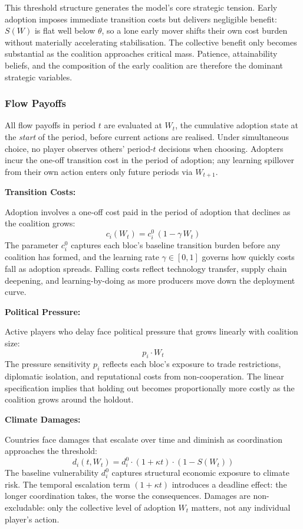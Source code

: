 \documentclass[10pt,a4paper]{article}
\newcommand{\bpar}[1]{%
  \par\addvspace{\medskipamount}%
  \needspace{4\baselineskip}%
  \noindent\textbf{#1}\par\nopagebreak[4]%
}
\begin{document}
This threshold structure generates the model's core strategic tension. Early adoption imposes immediate transition costs but delivers negligible benefit: $S(W)$ is flat well below $\theta$, so a lone early mover shifts their own cost burden without materially accelerating stabilisation. The collective benefit only becomes substantial as the coalition approaches critical mass. Patience, attainability beliefs, and the composition of the early coalition are therefore the dominant strategic variables.

\needspace{12em}
\subsubsection*{Flow Payoffs}

All flow payoffs in period $t$ are evaluated at $W_t$, the cumulative adoption state at the
\textit{start} of the period, before current actions are realised. Under simultaneous choice,
no player observes others' period-$t$ decisions when choosing. Adopters incur the one-off
transition cost in the period of adoption; any learning spillover from their own action enters
only future periods via $W_{t+1}$.

\bpar{Transition Costs:}
Adoption involves a one-off cost paid in the period of adoption that declines as the coalition
grows:
\[
c_i(W_t) = c_i^0\,(1 - \gamma\, W_t)
\]
The parameter $c_i^0$ captures each bloc's baseline transition burden before any coalition has
formed, and the learning rate $\gamma \in [0,1]$ governs how quickly costs fall as adoption
spreads. Falling costs reflect technology transfer, supply chain deepening, and learning-by-doing
as more producers move down the deployment curve.

\bpar{Political Pressure:}
Active players who delay face political pressure that grows linearly with coalition size:
\[
p_i \cdot W_t
\]
The pressure sensitivity $p_i$ reflects each bloc's exposure to trade restrictions, diplomatic
isolation, and reputational costs from non-cooperation. The linear specification implies that
holding out becomes proportionally more costly as the coalition grows around the holdout.

\bpar{Climate Damages:}
Countries face damages that escalate over time and diminish as coordination approaches the
threshold:
\[
d_i(t, W_t) = d_i^0 \cdot (1 + \kappa t) \cdot (1 - S(W_t))
\]
The baseline vulnerability $d_i^0$ captures structural economic exposure to climate risk. The
temporal escalation term $(1 + \kappa t)$ introduces a deadline effect: the longer coordination
takes, the worse the consequences. Damages are non-excludable: only the collective level of
adoption $W_t$ matters, not any individual player's action.
\end{document}

